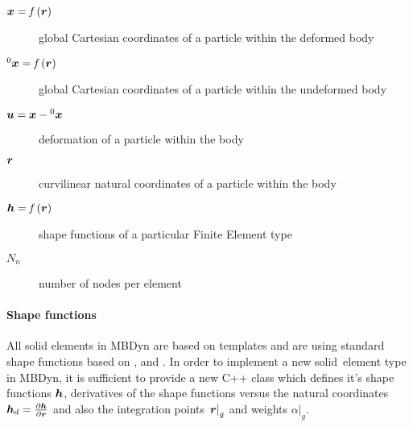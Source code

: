 \begin{description}
\item[$\bm{x}=\mathit{f}\left(\bm{r}\right)$] global Cartesian coordinates of a particle within the deformed body
\item[$^0\bm{x}=\mathit{f}\left(\bm{r}\right)$] global Cartesian coordinates of a particle within the undeformed body
\item[$\bm{u}=\bm{x}-{^0}\bm{x}$] deformation of a particle within the body
\item[$\bm{r}$] curvilinear natural coordinates of a particle within the body
\item[$\bm{h}=\mathit{f}\left(\bm{r}\right)$] shape functions of a particular Finite Element type
\item[$N_n$] number of nodes per element
\end{description}

\paragraph{Shape functions}
All solid elements in MBDyn are based on templates and are using standard shape functions based on \cite{BATHE2016}, \cite{DHONDT2004} and \cite{CODEASTERR30301}.
In order to implement a new solid~element type in MBDyn, it is sufficient to provide a new C++ class which defines it's shape functions $\bm{h}$,
derivatives of the shape functions versus the natural coordinates $\bm{h}_d=\frac{\partial \bm{h}}{\partial \bm{r}}$ and also the integration points $\left.\bm{r}\right\vert_g$ and weights $\left.\alpha\right\vert_g$.

